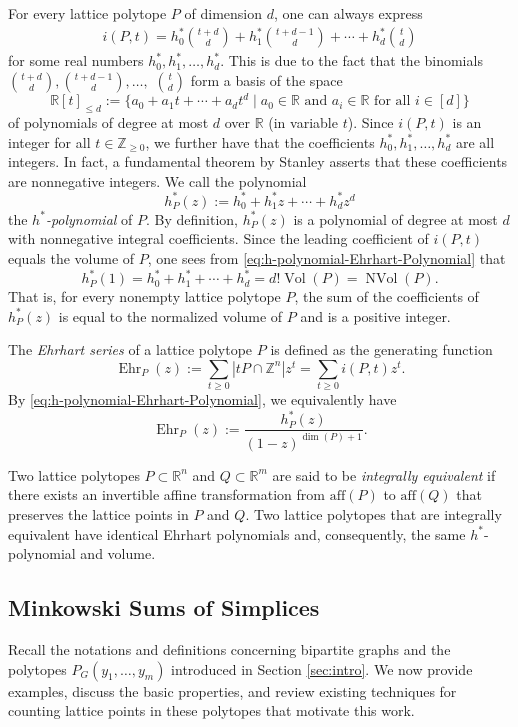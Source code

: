 \documentclass[11pt,a4paper]{article}
\newcommand{\R}{\mathbb{R}}
\newcommand{\Z}{\mathbb{Z}}
\newcommand{\Vol}{\operatorname{Vol}}
\newcommand{\NVol}{\operatorname{NVol}}
\newcommand{\Ehr}{\operatorname{Ehr}}
\newcommand{\1}{\mathbf{1}}
\theoremstyle{plain}
\theoremstyle{definition}
\begin{document}
For every lattice polytope $P$ of dimension $d$, one can always express
\begin{align}\label{eq:h-polynomial-Ehrhart-Polynomial}
    i(P,t) = h^*_0\binom{t+d}{d} + h^*_1\binom{t+d-1}{d} + \cdots + h^*_d\binom{t}{d}
\end{align}
for some real numbers $h^*_0, h^*_1, \dots, h^*_d.$ This is due to the fact that the binomials $\binom{t+d}{d}, \binom{t+d-1}{d}, \dots, $ $\binom{t}{d}$ form a basis of the space 
\[\R[t]_{\leq d} :=\{a_0 + a_1t+\cdots + a_dt^d\mid a_0 \in \R \text{ and } a_i \in \R \text{ for all } i \in [d]\}\]
of polynomials of degree at most $d$ over $\R$ (in variable $t$). Since $i(P,t)$ is an integer for all $t \in \Z_{\geq 0}$, we further have that the coefficients $h^*_0, h^*_1, \dots, h^*_d$ are all integers. In fact, a fundamental theorem by Stanley \cite{Stanley1980} asserts that these coefficients are nonnegative integers. We call the polynomial
\[h^*_P(z):= h^*_0 + h^*_1z + \cdots + h_d^*z^d\]
the \emph{$h^*$-polynomial} of $P$. By definition, $h^*_P(z)$ is a polynomial of degree at most $d$ with nonnegative integral coefficients. Since the leading coefficient of $i(P,t)$ equals the volume of $P$, one sees from \eqref{eq:h-polynomial-Ehrhart-Polynomial} that 
\[h^*_P(1) = h^*_0 + h^*_1 + \cdots + h^*_d = d!\Vol(P) = \NVol(P).\]
That is, for every nonempty lattice polytope $P$, the sum of the coefficients of $h^*_P(z)$ is equal to the normalized volume of $P$ and is a positive integer.

The \emph{Ehrhart series} of a lattice polytope $P$ is defined as the generating function
\[\Ehr_P(z):= \sum_{t \geq 0}|tP\cap \Z^n|z^t = \sum_{t \geq 0}i(P,t)z^t.\]
By \eqref{eq:h-polynomial-Ehrhart-Polynomial}, we equivalently have
\[\Ehr_P(z):= \frac{h^*_P(z)}{(1-z)^{\dim(P)+1}}.\]

Two lattice polytopes $P \subset \R^n$ and $Q \subset \R^m$ are said to be \emph{integrally equivalent} if there exists an invertible affine transformation from $\mathrm{aff}(P)$ to $\mathrm{aff}(Q)$ that preserves the lattice points in $P$ and $Q$. Two lattice polytopes that are integrally equivalent have identical Ehrhart polynomials and, consequently, the same $h^*$-polynomial and volume.


\subsection{Minkowski Sums of Simplices}\label{sec: sums-of-simplices}

Recall the notations and definitions concerning bipartite graphs and the polytopes $P_G(y_1,\dots, y_m)$ introduced in Section \ref{sec:intro}. We now provide examples, discuss the basic properties, and review existing techniques for counting lattice points in these polytopes that motivate this work.
\end{document}
